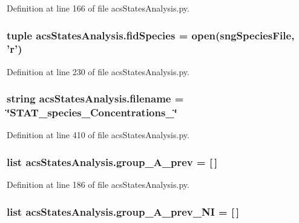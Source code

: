 Definition at line 166 of file acs\-States\-Analysis.\-py.

\hypertarget{a00098_afd34aa2ef2c410c2d71007bac0a121fd}{
\subsubsection[{fid\-Species}]{\setlength{\rightskip}{0pt plus 5cm}tuple acs\-States\-Analysis.\-fid\-Species = open(sng\-Species\-File, '{\bf r}')}}\label{a00098_afd34aa2ef2c410c2d71007bac0a121fd}


Definition at line 230 of file acs\-States\-Analysis.\-py.

\hypertarget{a00098_a69b59a10e5dc62a6e0d5325e9a27e5c6}{
\subsubsection[{filename}]{\setlength{\rightskip}{0pt plus 5cm}string acs\-States\-Analysis.\-filename = \char`\"{}S\-T\-A\-T\-\_\-species\-\_\-\-Concentrations\-\_\-\char`\"{}}}\label{a00098_a69b59a10e5dc62a6e0d5325e9a27e5c6}


Definition at line 410 of file acs\-States\-Analysis.\-py.

\hypertarget{a00098_a1dd2f2c85f697e454c99be1a157d6c17}{
\subsubsection[{group\-\_\-\-A\-\_\-prev}]{\setlength{\rightskip}{0pt plus 5cm}list acs\-States\-Analysis.\-group\-\_\-\-A\-\_\-prev = \mbox{[}$\,$\mbox{]}}}\label{a00098_a1dd2f2c85f697e454c99be1a157d6c17}


Definition at line 186 of file acs\-States\-Analysis.\-py.

\hypertarget{a00098_a4d77133a6a303d9486944707f3310cf8}{
\subsubsection[{group\-\_\-\-A\-\_\-prev\-\_\-\-N\-I}]{\setlength{\rightskip}{0pt plus 5cm}list acs\-States\-Analysis.\-group\-\_\-\-A\-\_\-prev\-\_\-\-N\-I = \mbox{[}$\,$\mbox{]}}}\label{a00098_a4d77133a6a303d9486944707f3310cf8}


